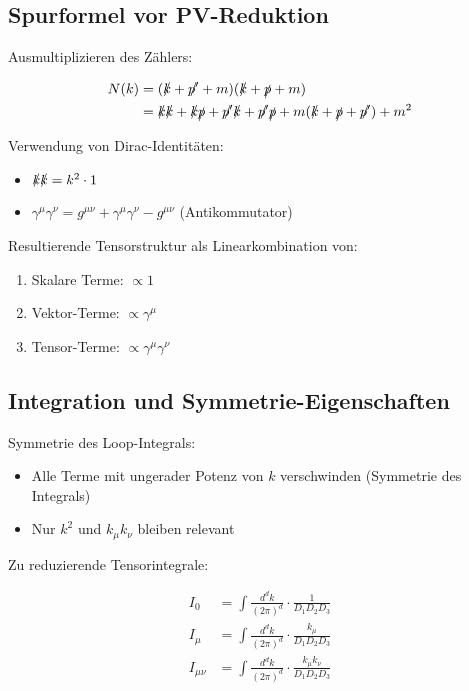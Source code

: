 \documentclass[12pt,a4paper]{article}
\theoremstyle{definition}
\begin{document}
	\subsection{Spurformel vor PV-Reduktion}
	
	Ausmultiplizieren des Zählers:
	
	\begin{align}
		N(k) &= (\slashed{k} + \slashed{p'} + m)(\slashed{k} + \slashed{p} + m)\\
		&= \slashed{k}\slashed{k} + \slashed{k}\slashed{p} + \slashed{p'}\slashed{k} + \slashed{p'}\slashed{p} + m(\slashed{k} + \slashed{p} + \slashed{p'}) + m^2
	\end{align}
	
	Verwendung von Dirac-Identitäten:
	\begin{itemize}
		\item $\slashed{k}\slashed{k} = k^2 \cdot 1$
		\item $\gamma^\mu\gamma^\nu = g^{\mu\nu} + \gamma^\mu\gamma^\nu - g^{\mu\nu}$ (Antikommutator)
	\end{itemize}
	
	Resultierende Tensorstruktur als Linearkombination von:
	\begin{enumerate}
		\item Skalare Terme: $\propto 1$
		\item Vektor-Terme: $\propto \gamma^\mu$  
		\item Tensor-Terme: $\propto \gamma^\mu\gamma^\nu$
	\end{enumerate}
	
	\subsection{Integration und Symmetrie-Eigenschaften}
	
	Symmetrie des Loop-Integrals:
	\begin{itemize}
		\item Alle Terme mit ungerader Potenz von $k$ verschwinden (Symmetrie des Integrals)
		\item Nur $k^2$ und $k_\mu k_\nu$ bleiben relevant
	\end{itemize}
	
	Zu reduzierende Tensorintegrale:
	
	\begin{align}
		I_0 &= \int \frac{d^d k}{(2\pi)^d} \cdot \frac{1}{D_1 D_2 D_3}\\
		I_\mu &= \int \frac{d^d k}{(2\pi)^d} \cdot \frac{k_\mu}{D_1 D_2 D_3}\\
		I_{\mu\nu} &= \int \frac{d^d k}{(2\pi)^d} \cdot \frac{k_\mu k_\nu}{D_1 D_2 D_3}
	\end{align}
	
\end{document}

